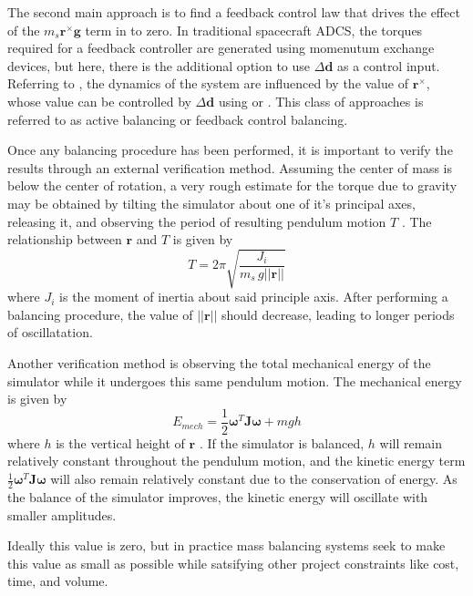 The second main approach is to find a feedback control law that drives the effect of the $m_s\bm{r}^{\times}\bm{g}$ term in  to zero. In traditional spacecraft ADCS, the torques required for a feedback controller are generated using momenutum exchange devices, but here, there is the additional option to use $\Delta\bm{d}$ as a control input. Referring to , the dynamics of the system are influenced by the value of $\bm{r}^{\times}$, whose value can be controlled by $\Delta\bm{d}$ using  or . This class of approaches is referred to as active balancing or feedback control balancing.

Once any balancing procedure has been performed, it is important to verify the results through an external verification method. Assuming the center of mass is below the center of rotation, a very rough estimate for the torque due to gravity may be obtained by tilting the simulator about one of it's principal axes, releasing it, and observing the period of resulting pendulum motion $T$ \cite{kim_automatic_2009}. The relationship between $\bm{r}$ and $T$ is given by
\begin{equation}
    T = 2\pi\sqrt{\frac{J_i}{m_s\,g||\bm{r}||}}
\end{equation}
where $J_i$ is the moment of inertia about said principle axis. After performing a balancing procedure, the value of $||\bm{r}||$ should decrease, leading to longer periods of oscillatation. 

Another verification method is observing the total mechanical energy of the simulator while it undergoes this same pendulum motion. The mechanical energy is given by
\begin{equation}
    E_{mech} = \frac{1}{2}\bm{\omega}^T\bm{J}\bm{\omega} + mgh
\end{equation}
where $h$ is the vertical height of $\bm{r}$ \cite{silva_filtering_2018}. If the simulator is balanced, $h$ will remain relatively constant throughout the pendulum motion, and the kinetic energy term $\frac{1}{2}\bm{\omega}^T\bm{J}\bm{\omega}$ will also remain relatively constant due to the conservation of energy. As the balance of the simulator improves, the kinetic energy will oscillate with smaller amplitudes.

Ideally this value is zero, but in practice mass balancing systems seek to make this value as small as possible while satsifying other project constraints like cost, time, and volume. 


